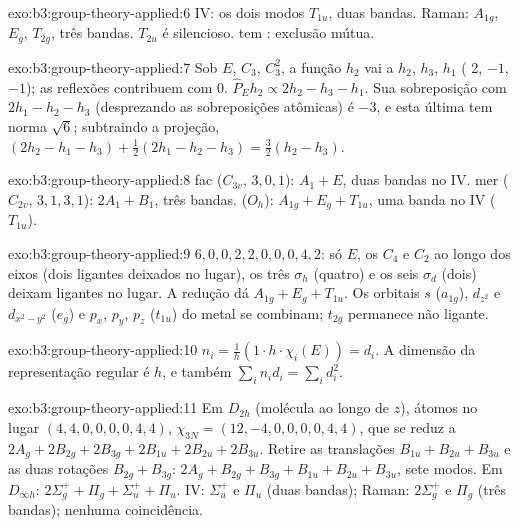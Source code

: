 \begin{solution}{exo:b3:group-theory-applied:6}
IV: os dois modos $T_{1u}$, duas bandas. Raman: $A_{1g}$, $E_g$, $T_{2g}$, três bandas.
$T_{2u}$ é silencioso.  tem : exclusão mútua.
\end{solution}

\begin{solution}{exo:b3:group-theory-applied:7}
Sob $E$, $C_3$, $C_3^2$, a função $h_2$ vai a $h_2$, $h_3$, $h_1$ ( 2,
$-1$, $-1$); as reflexões contribuem com 0. $\hat P_Eh_2 \propto 2h_2 - h_3 - h_1$.
Sua sobreposição com $2h_1 - h_2 - h_3$ (desprezando as sobreposições atômicas) é $-3$, e
esta última tem norma $\sqrt6$; subtraindo a projeção, $(2h_2 - h_1 - h_3) +
\frac12(2h_1 - h_2 - h_3) = \frac32(h_2 - h_3)$.
\end{solution}

\begin{solution}{exo:b3:group-theory-applied:8}
fac ($C_{3v}$,  $3, 0, 1$): $A_1 + E$, duas bandas no IV. mer ($C_{2v}$,
 $3, 1, 3, 1$): $2A_1 + B_1$, três bandas.  ($O_h$): $A_{1g} + E_g
+ T_{1u}$, uma banda no IV ($T_{1u}$).
\end{solution}

\begin{solution}{exo:b3:group-theory-applied:9}
 $6, 0, 0, 2, 2, 0, 0, 0, 4, 2$: só $E$, os $C_4$ e $C_2$ ao longo dos
eixos (dois ligantes deixados no lugar), os três $\sigma_h$ (quatro) e os seis $\sigma_d$
(dois) deixam ligantes no lugar. A redução dá $A_{1g} + E_g + T_{1u}$. Os orbitais $s$
($a_{1g}$), $d_{z^2}$ e $d_{x^2-y^2}$ ($e_g$) e $p_x$, $p_y$, $p_z$ ($t_{1u}$) do metal se
combinam; $t_{2g}$ permanece não ligante.
\end{solution}

\begin{solution}{exo:b3:group-theory-applied:10}
$n_i = \frac1h(1\cdot h\cdot\chi_i(E)) = d_i$. A dimensão da representação
regular é $h$, e também $\sum_in_id_i = \sum_id_i^2$.
\end{solution}

\begin{solution}{exo:b3:group-theory-applied:11}
Em $D_{2h}$ (molécula ao longo de $z$), átomos no lugar $(4, 4, 0, 0, 0, 0, 4, 4)$, $\chi_{3N}
= (12, -4, 0, 0, 0, 0, 4, 4)$, que se reduz a $2A_g + 2B_{2g} + 2B_{3g} + 2B_{1u} + 2B_{2u}
+ 2B_{3u}$. Retire as translações $B_{1u} + B_{2u} + B_{3u}$ e as duas rotações
$B_{2g} + B_{3g}$: $2A_g + B_{2g} + B_{3g} + B_{1u} + B_{2u} + B_{3u}$, sete modos.
Em $D_{\infty h}$: $2\Sigma_g^+ + \Pi_g + \Sigma_u^+ + \Pi_u$. IV: $\Sigma_u^+$ e $\Pi_u$
(duas bandas); Raman: $2\Sigma_g^+$ e $\Pi_g$ (três bandas); nenhuma coincidência.
\end{solution}


